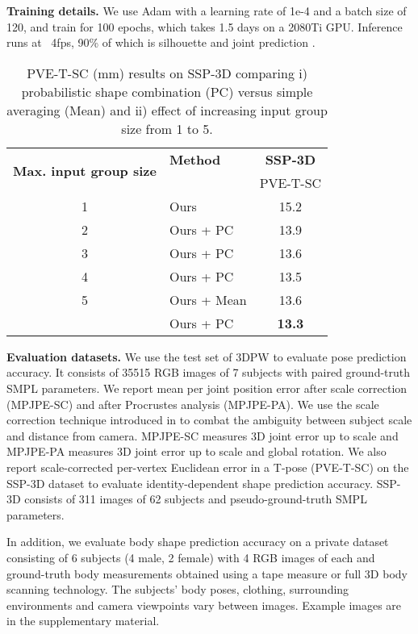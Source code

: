 \documentclass[final]{cvpr}
\begin{document}
\noindent \textbf{Training details.} We use Adam \cite{kingma2014adam} with a learning rate of 1e-4 and a batch size of 120, and train for 100 epochs, which takes 1.5 days on a 2080Ti GPU. Inference runs at ~4fps, 90\% of which is silhouette and joint prediction \cite{Guler2018DensePose, wu2019detectron2}.

\begin{table}[t!]
\centering
\small
\begin{tabular}{c l c} 
 \hline
 \multirow{2}{0.23\linewidth}{\textbf{Max. input group size}} & \textbf{Method} & \textbf{SSP-3D}\\
 & & PVE-T-SC\\ [0.5ex] 
 \hline
 1 & Ours & 15.2\\
 2 & Ours + PC & 13.9\\
 3 & Ours + PC & 13.6\\
 4 & Ours + PC & 13.5\\
 \hline
 5 & Ours + Mean & 13.6\\
& Ours + PC & \textbf{13.3}\\
 \hline
\end{tabular}
\caption{PVE-T-SC (mm) results on SSP-3D \cite{STRAPS2020BMVC} comparing i) probabilistic shape combination (PC) versus simple averaging (Mean) and ii) effect of increasing input group size from 1 to 5.}
\vspace{-0.3cm}
\label{table:ssp3d_ablation_comparison}
\end{table}

\noindent \textbf{Evaluation datasets.} We use the test set of 3DPW to evaluate pose prediction accuracy. It consists of 35515 RGB images of 7 subjects with paired ground-truth SMPL parameters. We report mean per joint position error after scale correction (MPJPE-SC) and after Procrustes analysis (MPJPE-PA). We use the scale correction technique introduced in \cite{STRAPS2020BMVC} to combat the ambiguity between subject scale and distance from camera. MPJPE-SC measures 3D joint error up to scale and MPJPE-PA measures 3D joint error up to scale and global rotation. We also report scale-corrected per-vertex Euclidean error in a T-pose (PVE-T-SC) on the SSP-3D dataset \cite{STRAPS2020BMVC} to evaluate identity-dependent shape prediction accuracy. SSP-3D consists of 311 images of 62 subjects and pseudo-ground-truth SMPL parameters.

In addition, we evaluate body shape prediction accuracy on a private dataset consisting of 6 subjects (4 male, 2 female) with 4 RGB images of each and ground-truth body measurements obtained using a tape measure or full 3D body scanning technology. The subjects' body poses, clothing, surrounding environments and camera viewpoints vary between images. Example images are in the supplementary material.
\end{document}

